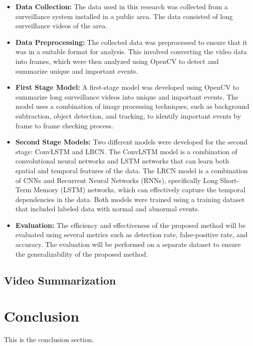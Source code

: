 \documentclass[title page]{article}
\begin{document}
\begin{itemize}
    \item \textbf{Data Collection:} The data used in this research was collected from a surveillance system installed in a public area. The data consisted of long surveillance videos of the area.
    \item \textbf{Data Preprocessing:} The collected data was preprocessed to ensure that it was in a suitable format for analysis. This involved converting the video data into frames, which were then analyzed using OpenCV to detect and summarize unique and important events.
    \item \textbf{First Stage Model:} A first-stage model was developed using OpenCV to summarize long surveillance videos into unique and important events. The model uses a combination of image processing techniques, such as background subtraction, object detection, and tracking, to identify important events by frame to frame checking process.
    \item \textbf{Second Stage Models:} Two different models were developed for the second stage: ConvLSTM and LRCN. The ConvLSTM model is a combination of convolutional neural networks and LSTM networks that can learn both spatial and temporal features of the data. The LRCN model is a combination of CNNs and Recurrent Neural Networks (RNNs), specifically Long Short-Term Memory (LSTM) networks, which can effectively capture the temporal dependencies in the data. Both models were trained using a training dataset that included labeled data with normal and abnormal events.
    \item \textbf{Evaluation:} The efficiency and effectiveness of the proposed method will be evaluated using several metrics such as detection rate, false-positive rate, and accuracy. The evaluation will be performed on a separate dataset to ensure the generalizability of the proposed method.   
\end{itemize}

\subsection{Video Summarization}



\section{Conclusion}

This is the conclusion section.
\end{document}
